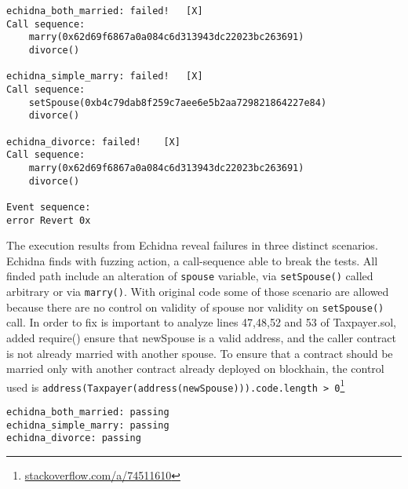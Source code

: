 \documentclass{article}
\begin{document}
\begin{verbatim}
echidna_both_married: failed!   [X]
Call sequence:
    marry(0x62d69f6867a0a084c6d313943dc22023bc263691)
    divorce()

echidna_simple_marry: failed!   [X]
Call sequence:
    setSpouse(0xb4c79dab8f259c7aee6e5b2aa729821864227e84)
    divorce()

echidna_divorce: failed!    [X]
Call sequence:
    marry(0x62d69f6867a0a084c6d313943dc22023bc263691)
    divorce()

Event sequence:
error Revert 0x
\end{verbatim} 
The execution results from Echidna reveal failures in three distinct scenarios. Echidna finds with fuzzing action, a call-sequence able to break the tests. All finded path include an alteration of \texttt{spouse} variable, via \texttt{setSpouse()} called arbitrary or via \texttt{marry()}. With original code some of those scenario are allowed because there are no control on validity of spouse nor validity on \texttt{setSpouse()} call.
In order to fix is important to analyze lines 47,48,52 and 53 of Taxpayer.sol, added require() ensure that newSpouse is a valid address, and the caller contract is not already married with another spouse.
To ensure that a contract should be married only with another contract already deployed on blockhain, the control used is \texttt{address(Taxpayer(address(newSpouse))).code.length > 0}\footnote{\href{https://stackoverflow.com/a/74511610}{stackoverflow.com/a/74511610}}
\begin{verbatim}
echidna_both_married: passing
echidna_simple_marry: passing
echidna_divorce: passing
\end{verbatim} 
 
\end{document}

